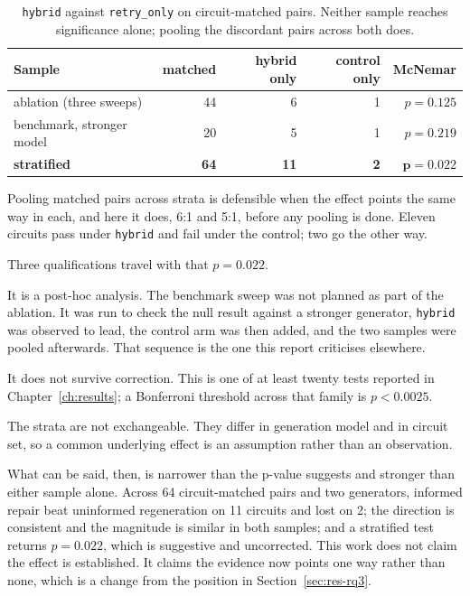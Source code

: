 \documentclass[11pt,a4paper,titlepage=false]{scrreprt}
\begin{document}
\begin{table}[H]
\centering
\small
\begin{tabular}{@{}l r r r r@{}}
\toprule
\textbf{Sample} & \textbf{matched} & \textbf{hybrid only} & \textbf{control only} & \textbf{McNemar} \\
\midrule
ablation (three sweeps)      & 44 & 6  & 1 & $p=0.125$ \\
benchmark, stronger model    & 20 & 5  & 1 & $p=0.219$ \\
\midrule
\textbf{stratified}          & \textbf{64} & \textbf{11} & \textbf{2} & $\mathbf{p=0.022}$ \\
\bottomrule
\end{tabular}
\caption{\texttt{hybrid} against \texttt{retry\_only} on circuit-matched pairs. Neither sample
reaches significance alone; pooling the discordant pairs across both does.}
\label{tab:strata}
\end{table}

Pooling matched pairs across strata is defensible when the effect points the same way in each,
and here it does, 6:1 and 5:1, before any pooling is done. Eleven circuits pass under
\texttt{hybrid} and fail under the control; two go the other way.

Three qualifications travel with that $p=0.022$.

It is a post-hoc analysis. The benchmark sweep was not planned as part of the ablation. It was
run to check the null result against a stronger generator, \texttt{hybrid} was observed to
lead, the control arm was then added, and the two samples were pooled afterwards. That
sequence is the one this report criticises elsewhere.

It does not survive correction. This is one of at least twenty tests reported in
Chapter~\ref{ch:results}; a Bonferroni threshold across that family is $p<0.0025$.

The strata are not exchangeable. They differ in generation model and in circuit set, so a
common underlying effect is an assumption rather than an observation.

What can be said, then, is narrower than the p-value suggests and stronger than either sample
alone. Across 64 circuit-matched pairs and two generators, informed repair beat uninformed
regeneration on 11 circuits and lost on 2; the direction is consistent and the magnitude is
similar in both samples; and a stratified test returns $p=0.022$, which is suggestive and
uncorrected. This work does not claim the effect is established. It claims the evidence now
points one way rather than none, which is a change from the position in
Section~\ref{sec:res-rq3}.
\end{document}
